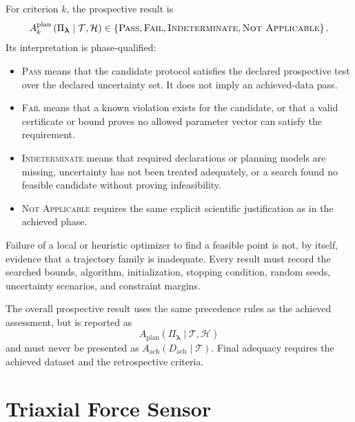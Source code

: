 \documentclass[11pt,a4paper]{article}
\begin{document}
For criterion $k$, the prospective result is
\begin{equation}
    A_k^{\mathrm{plan}}
    \left(
        \Pi_{\boldsymbol{\lambda}}
        \mid
        \mathcal{T},
        \mathcal{H}
    \right)
    \in
    \left\{
        \textsc{Pass},
        \textsc{Fail},
        \textsc{Indeterminate},
        \textsc{Not Applicable}
    \right\}.
\end{equation}
Its interpretation is phase-qualified:
\begin{itemize}
    \item \textsc{Pass} means that the candidate protocol satisfies the
        declared prospective test over the declared uncertainty set. It does
        not imply an achieved-data pass.
    \item \textsc{Fail} means that a known violation exists for the candidate,
        or that a valid certificate or bound proves no allowed parameter vector
        can satisfy the requirement.
    \item \textsc{Indeterminate} means that required declarations or planning
        models are missing, uncertainty has not been treated adequately, or a
        search found no feasible candidate without proving infeasibility.
    \item \textsc{Not Applicable} requires the same explicit scientific
        justification as in the achieved phase.
\end{itemize}

Failure of a local or heuristic optimizer to find a feasible point is not, by
itself, evidence that a trajectory family is inadequate. Every result must
record the searched bounds, algorithm, initialization, stopping condition,
random seeds, uncertainty scenarios, and constraint margins.

The overall prospective result uses the same precedence rules as the achieved
assessment, but is reported as
\begin{equation}
    A_{\mathrm{plan}}
    \left(
        \Pi_{\boldsymbol{\lambda}}
        \mid
        \mathcal{T},
        \mathcal{H}
    \right)
\end{equation}
and must never be presented as
$A_{\mathrm{ach}}(D_{\mathrm{ach}}\mid\mathcal{T})$. Final adequacy requires
the achieved dataset and the retrospective criteria.



\newpage
\section{Triaxial Force Sensor}
\end{document}
